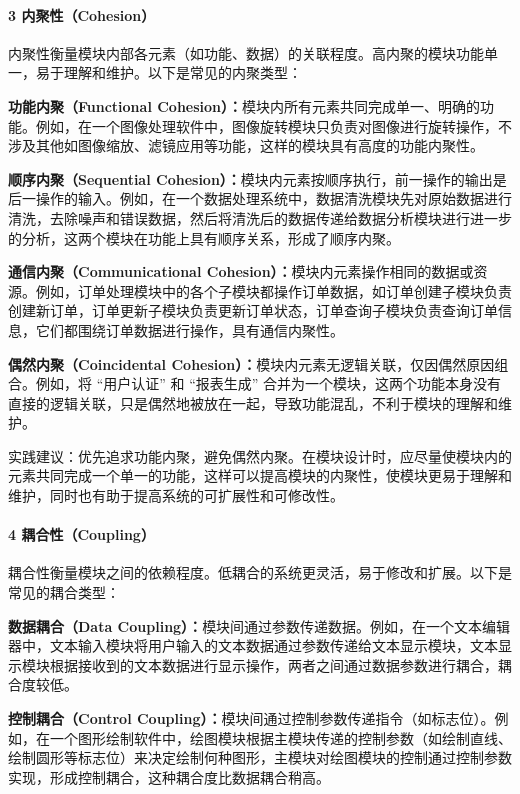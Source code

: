 \paragraph{3 内聚性（Cohesion）}\label{ux5185ux805aux6027cohesion}

内聚性衡量模块内部各元素（如功能、数据）的关联程度。高内聚的模块功能单一，易于理解和维护。以下是常见的内聚类型：

\textbf{功能内聚（Functional Cohesion）：}模块内所有元素共同完成单一、明确的功能。例如，在一个图像处理软件中，图像旋转模块只负责对图像进行旋转操作，不涉及其他如图像缩放、滤镜应用等功能，这样的模块具有高度的功能内聚性。

\textbf{顺序内聚（Sequential Cohesion）：}模块内元素按顺序执行，前一操作的输出是后一操作的输入。例如，在一个数据处理系统中，数据清洗模块先对原始数据进行清洗，去除噪声和错误数据，然后将清洗后的数据传递给数据分析模块进行进一步的分析，这两个模块在功能上具有顺序关系，形成了顺序内聚。

\textbf{通信内聚（Communicational Cohesion）：}模块内元素操作相同的数据或资源。例如，订单处理模块中的各个子模块都操作订单数据，如订单创建子模块负责创建新订单，订单更新子模块负责更新订单状态，订单查询子模块负责查询订单信息，它们都围绕订单数据进行操作，具有通信内聚性。

\textbf{偶然内聚（Coincidental Cohesion）：}模块内元素无逻辑关联，仅因偶然原因组合。例如，将 ``用户认证'' 和 ``报表生成'' 合并为一个模块，这两个功能本身没有直接的逻辑关联，只是偶然地被放在一起，导致功能混乱，不利于模块的理解和维护。

实践建议：优先追求功能内聚，避免偶然内聚。在模块设计时，应尽量使模块内的元素共同完成一个单一的功能，这样可以提高模块的内聚性，使模块更易于理解和维护，同时也有助于提高系统的可扩展性和可修改性。

\paragraph{4 耦合性（Coupling）}\label{ux8026ux5408ux6027coupling}

耦合性衡量模块之间的依赖程度。低耦合的系统更灵活，易于修改和扩展。以下是常见的耦合类型：

\textbf{数据耦合（Data Coupling）：}模块间通过参数传递数据。例如，在一个文本编辑器中，文本输入模块将用户输入的文本数据通过参数传递给文本显示模块，文本显示模块根据接收到的文本数据进行显示操作，两者之间通过数据参数进行耦合，耦合度较低。

\textbf{控制耦合（Control Coupling）：}模块间通过控制参数传递指令（如标志位）。例如，在一个图形绘制软件中，绘图模块根据主模块传递的控制参数（如绘制直线、绘制圆形等标志位）来决定绘制何种图形，主模块对绘图模块的控制通过控制参数实现，形成控制耦合，这种耦合度比数据耦合稍高。

